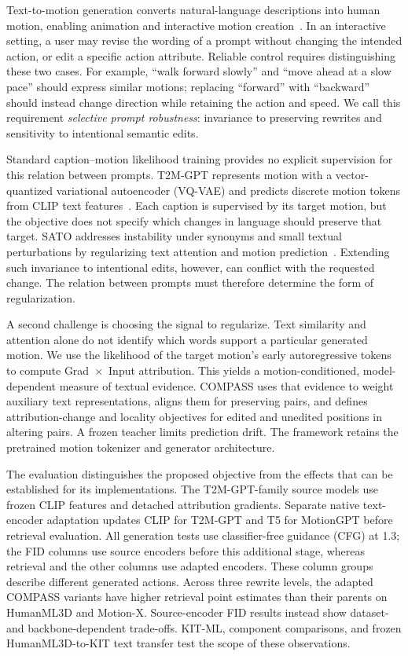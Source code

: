 Text-to-motion generation converts natural-language descriptions into human
motion, enabling animation and interactive motion
creation~\cite{zhang2023generating,tevet2022humanmotiondiffusionmodel}.
In an interactive setting, a user may revise the wording of a prompt without
changing the intended action, or edit a specific action attribute. Reliable
control requires distinguishing these two cases. For example, ``walk forward
slowly'' and ``move ahead at a slow pace'' should express similar motions;
replacing ``forward'' with ``backward'' should instead change direction while
retaining the action and speed. We call this requirement \emph{selective
prompt robustness}: invariance to preserving rewrites and sensitivity to
intentional semantic edits.

Standard caption--motion likelihood training provides no explicit supervision
for this relation between prompts. T2M-GPT represents motion with a
vector-quantized variational autoencoder (VQ-VAE) and predicts discrete motion
tokens from CLIP text features~\cite{zhang2023generating,radford2021learning}.
Each caption is supervised by its target motion, but the objective does not
specify which changes in language should preserve that target. SATO addresses
instability under synonyms and small textual perturbations by regularizing
text attention and motion prediction~\cite{chen2024sato}. Extending such
invariance to intentional edits, however, can conflict with the requested
change. The relation between prompts must therefore determine the form of
regularization.

A second challenge is choosing the signal to regularize. Text similarity and
attention alone do not identify which words support a particular generated
motion. We use the likelihood of the target motion's early autoregressive
tokens to compute Grad~$\times$~Input attribution. This yields a
motion-conditioned, model-dependent measure of textual evidence. COMPASS uses
that evidence to weight auxiliary text representations, aligns them for
preserving pairs, and defines attribution-change and locality objectives for
edited and unedited positions in altering pairs. A frozen teacher limits
prediction drift. The framework retains the pretrained motion tokenizer and
generator architecture.

The evaluation distinguishes the proposed objective from the effects that
can be established for its implementations. The T2M-GPT-family source models
use frozen CLIP features and detached attribution gradients. Separate native
text-encoder adaptation updates CLIP for T2M-GPT and T5 for MotionGPT before
retrieval evaluation. All generation tests use classifier-free guidance
(CFG) at 1.3; the FID columns use source encoders before this additional stage,
whereas retrieval and the other columns use adapted encoders. These column
groups describe different generated actions. Across three rewrite levels,
the adapted COMPASS variants have higher retrieval point estimates than their
parents on HumanML3D and Motion-X. Source-encoder FID results instead show
dataset- and backbone-dependent trade-offs. KIT-ML, component comparisons,
and frozen HumanML3D-to-KIT text transfer test the scope of these observations.

